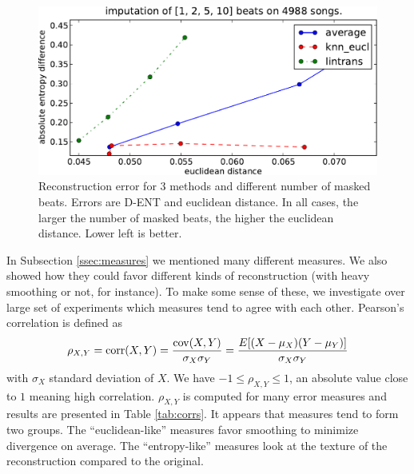 \documentclass{article}
\begin{document}
\begin{figure}[t]
\begin{center}
\includegraphics[width=.9\columnwidth]{recon_score_in_2d_5k}
\end{center}
\caption{Reconstruction error for $3$ methods and different
number of masked beats. Errors are D-ENT and euclidean
distance. In all cases, the larger the number of masked beats,
the higher the euclidean distance. Lower left is better.
\label{fig:2dscore}}
\end{figure}

In Subsection \ref{ssec:measures} we mentioned many different measures.
We also showed how they could favor different kinds of reconstruction
(with heavy smoothing or not, for instance). To make some sense of
these, we investigate over large set of experiments which measures tend
to agree with each other.
Pearson's correlation is defined as
\[
\rho_{X,Y}=\mathrm{corr}(X,Y)={\mathrm{cov}(X,Y) \over \sigma_X \sigma_Y} ={E[(X-\mu_X)(Y-\mu_Y)] \over \sigma_X\sigma_Y}
\]
with $\sigma_X$ standard deviation of $X$. We have $-1 \leq \rho_{X,Y} \leq 1$, an absolute
value close to $1$ meaning high correlation.
$\rho_{X,Y}$ is computed for many error measures and results are presented in
Table \ref{tab:corrs}. It appears that measures tend to form two groups.
The ``euclidean-like'' measures favor smoothing to minimize divergence on
average. The ``entropy-like'' measures look at the texture of the reconstruction
compared to the original.
\end{document}
